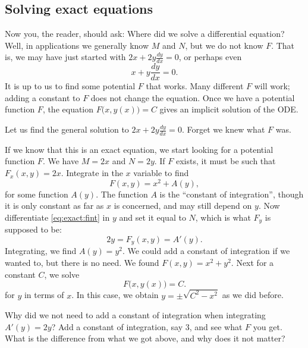 \documentclass{ximera}
\begin{document}
\subsection{Solving exact equations}

Now you, the reader, should ask: Where did we solve a differential equation? Well, in applications we generally know $M$ and $N$, but we do not know $F$.  That is, we may have just started with $2x + 2y \frac{dy}{dx} = 0$, or perhaps even
\begin{equation*}
    x + y \frac{dy}{dx} = 0 .
\end{equation*}
It is up to us to find some potential $F$ that works.  Many different $F$ will work; adding a constant to $F$ does not change the equation. Once we have a potential function $F$, the equation  $F\bigl(x,y(x)\bigr) = C$ gives an implicit solution of the ODE\@.

\begin{example}
    Let us find the general solution to $2x + 2y \frac{dy}{dx} = 0$.  Forget we knew what $F$ was.
\end{example}

\begin{exampleSol}
    If we know that this is an exact equation, we start looking for a potential function $F$. We have $M = 2x$ and $N=2y$. If $F$ exists, it must be such that $F_x (x,y) = 2x$. Integrate in the $x$ variable to find
    \begin{equation} \label{eq:exact:fint}
        F(x,y) = x^2 + A(y) ,
    \end{equation}
    for some function $A(y)$.  The function $A$ is the ``constant of integration'', though it is only constant as far as $x$ is concerned, and may still depend on $y$.  Now differentiate \eqref{eq:exact:fint} in $y$  and set it equal to $N$, which is what $F_y$ is supposed to be:
    \begin{equation*}
        2y = F_y (x,y) = A'(y) .
    \end{equation*}
    Integrating, we find $A(y) = y^2$.  We could add a constant of integration if we wanted to, but there is no need.  We found $F(x,y) = x^2+y^2$. Next for a constant $C$, we solve
    \begin{equation*}
        F\bigl(x,y(x)\bigr) = C .
    \end{equation*}
    for $y$ in terms of $x$.  In this case, we obtain $y = \pm \sqrt{C^2-x^2}$ as we did before.
\end{exampleSol}

\begin{exercise}
    Why did we not need to add a constant of integration when integrating $A'(y) = 2y$?  Add a constant of integration, say $3$, and see what $F$ you get. What is the difference from what we got above, and why does it not matter?
\end{exercise}
\end{document}
